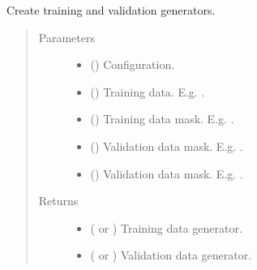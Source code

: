 \documentclass[letterpaper,10pt,english]{sphinxmanual}
\begin{document}
\begin{fulllineitems}
\label{\detokenize{data/generators/init:data.generators.create_train_val_augmentors}}
Create training and validation generators.
\begin{quote}\begin{description}
\item[{Parameters}] \leavevmode\begin{itemize}
\item {} 
 () \textendash{} Configuration.

\item {} 
 () \textendash{} Training data. E.g. .

\item {} 
 () \textendash{} Training data mask. E.g. .

\item {} 
 () \textendash{} Validation data mask. E.g. .

\item {} 
 () \textendash{} Validation data mask. E.g. .

\end{itemize}

\item[{Returns}] \leavevmode
\begin{itemize}
\item {} 
 ( or ) \textendash{} Training data generator.

\item {} 
 ( or ) \textendash{} Validation data generator.

\end{itemize}


\end{description}\end{quote}

\end{fulllineitems}
\end{document}
